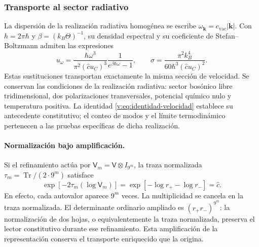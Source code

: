 \subsubsection{Transporte al sector radiativo}

La dispersión de la realización radiativa homogénea se escribe
$\omega_{\symbf{k}}=c_{\mathrm{vac}}|\symbf{k}|$.
Con $h=2\pi\hbar$ y $\beta=(k_B\Theta)^{-1}$, su densidad espectral
y su coeficiente de Stefan--Boltzmann admiten las expresiones
\begin{equation}
 u_\omega=
 \frac{\hbar\omega^3}{\pi^2(\widehat c u_C)^3}
 \frac{1}{e^{\beta\hbar\omega}-1},
 \qquad
 \sigma=\frac{\pi^2k_B^4}{60\hbar^3(\widehat c u_C)^2}.
 \label{v:eq:radiacion-velocidad-constitutiva}
\end{equation}
Estas sustituciones transportan exactamente la misma sección de
velocidad. Se conservan las condiciones de la realización radiativa:
sector bosónico libre tridimensional, dos polarizaciones transversales,
potencial químico nulo y temperatura positiva. La identidad
\eqref{v:eq:identidad-velocidad} establece su antecedente constitutivo;
el conteo de modos y el límite termodinámico pertenecen a las pruebas
específicas de dicha realización.

\paragraph{Normalización bajo amplificación.}
Si el refinamiento actúa por $\mathsf V_m=\mathsf V\otimes I_{9^m}$,
la traza normalizada $\tau_m=\operatorname{Tr}/(2\cdot9^m)$ satisface
\[
 \exp[-2\tau_m(\log\mathsf V_m)]
 =\exp[-\log r_+-\log r_-]=\widehat c.
\]
En efecto, cada autovalor aparece $9^m$ veces. La multiplicidad se
cancela en la traza normalizada. El determinante ordinario ampliado es
$(r_+r_-)^{9^m}$: la normalización de dos hojas, o equivalentemente la
traza normalizada, preserva el lector constitutivo durante ese
refinamiento. Esta amplificación de la representación conserva el
transporte enriquecido que la origina.
